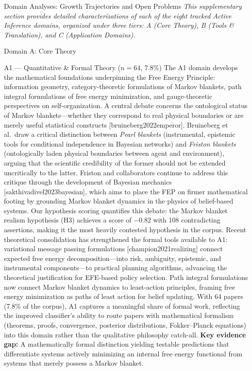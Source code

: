 \documentclass[
  ignorenonframetext,
]{beamer}
\author{\texorpdfstring{}{}}
\date{}
\providecommand{\citep}[1]{[#1]}
\begin{document}
\begin{frame}[allowframebreaks]{Domain Analyses: Growth Trajectories and
Open Problems \label{sec:subfield_analyses}}
\protect{}\label{domain-analyses-growth-trajectories-and-open-problems}
\emph{This supplementary section provides detailed characterizations of
each of the eight tracked Active Inference domains, organized under
three tiers: A (Core Theory), B (Tools \& Translation), and C
(Application Domains).}

\begin{block}{Domain A: Core Theory}
\protect{}\label{domain-a-core-theory}
\begin{block}{A1 --- Quantitative \& Formal Theory (\(n = 64\), 7.8\%)}
\protect{}\label{a1-quantitative-formal-theory-n-64-7.8}
The A1 domain develops the mathematical foundations underpinning the
Free Energy Principle: information geometry, category-theoretic
formulations of Markov blankets, path integral formulations of free
energy minimization, and gauge-theoretic perspectives on
self-organization. A central debate concerns the ontological status of
Markov blankets---whether they correspond to real physical boundaries or
are merely useful statistical constructs \citep{bruineberg2022emperor}.
Bruineberg et al.~draw a critical distinction between \emph{Pearl
blankets} (instrumental, epistemic tools for conditional independence in
Bayesian networks) and \emph{Friston blankets} (ontologically laden
physical boundaries between agent and environment), arguing that the
scientific credibility of the former should not be extended uncritically
to the latter. Friston and collaborators continue to address this
critique through the development of Bayesian mechanics
\citep{sakthivadivel2023bayesian}, which aims to place the FEP on firmer
mathematical footing by grounding Markov blanket dynamics in the physics
of belief-based systems. Our hypothesis scoring quantifies this debate:
the Markov blanket realism hypothesis (H3) achieves a score of \(-0.82\)
with 108 contradicting assertions, making it the most heavily contested
hypothesis in the corpus. Recent theoretical consolidation has
strengthened the formal tools available to A1: variational message
passing formulations \citep{champion2021realizing} connect expected free
energy decomposition---into risk, ambiguity, epistemic, and instrumental
components---to practical planning algorithms, advancing the theoretical
justification for EFE-based policy selection. Path integral formulations
now connect Markov blanket dynamics to least-action principles, framing
free energy minimization as paths of least action for belief updating.
With 64 papers (7.8\% of the corpus), A1 captures a meaningful share of
formal work, reflecting the improved classifier's ability to route
papers with mathematical formalism (theorems, proofs, convergence,
posterior distributions, Fokker--Planck equations) into this domain
rather than the qualitative philosophy catch-all. \textbf{Key evidence
gap:} A mathematically formal distinction yielding testable predictions
that differentiate systems actively minimizing an internal free energy
functional from systems that merely possess a Markov blanket.
\end{block}


\end{block}
\end{frame}
\end{document}
